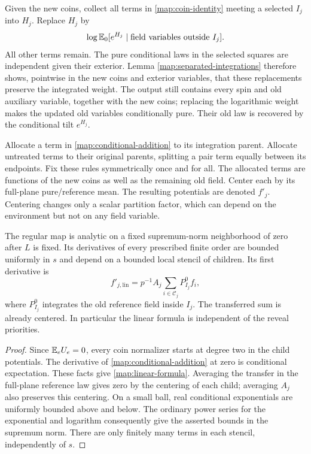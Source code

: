 Given the new coins, collect all terms in
\eqref{map:coin-identity} meeting a selected $I_j$ into $H_j$.
Replace $H_j$ by
\begin{equation}\label{map:conditional-addition}
 \log\mathbb E_0[e^{H_j}\mid\text{field variables outside }I_j].
\end{equation}
All other terms remain.  The pure conditional laws in the selected
squares are independent given their exterior.  Lemma
\ref{map:separated-integrations} therefore shows, pointwise in the new
coins and exterior variables, that these replacements preserve the
integrated weight.  The output still contains every spin and old
auxiliary variable, together with the new coins; replacing the
logarithmic weight makes the updated old variables conditionally pure.
Their old law is recovered by the conditional tilt $e^{H_j}$.

Allocate a term in \eqref{map:conditional-addition} to its integration
parent.  Allocate untreated terms to their original parents, splitting
a pair term equally between its endpoints.  Fix these rules
symmetrically once and for all.  The allocated terms are functions of
the new coins as well as the remaining old field.  Center each by its
full-plane pure/reference mean.  The resulting potentials are denoted
$f'_j$.  Centering changes only a scalar partition factor, which can
depend on the environment but not on any field variable.

\begin{lemma}\label{map:linearization}
The regular map is analytic on a fixed supremum-norm neighborhood of
zero after $L$ is fixed.  Its derivatives of every prescribed finite
order are bounded uniformly in $s$ and depend on a bounded local
stencil of children.  Its first derivative is
\begin{equation}\label{map:linear-formula}
 f'_{j,\mathrm{lin}}
 =p^{-1}A_j\sum_{i\in\mathcal C_j}P^0_{I_j}f_i,
\end{equation}
where $P^0_{I_j}$ integrates the old reference field inside $I_j$.
The transferred sum is already centered.  In particular the linear
formula is independent of the reveal priorities.
\end{lemma}

\begin{proof}
Since $\mathbb E_eU_e=0$, every coin normalizer starts at degree two in the
child potentials.  The derivative of \eqref{map:conditional-addition}
at zero is conditional expectation.  These facts give
\eqref{map:linear-formula}.  Averaging the transfer in the full-plane
reference law gives zero by the centering of each child; averaging $A_j$
also preserves this centering.  On a small ball, real conditional
exponentials are uniformly bounded above and below.  The ordinary
power series for the exponential and logarithm consequently give the
asserted bounds in the supremum norm.  There are only finitely many
terms in each stencil, independently of $s$.
\end{proof}

